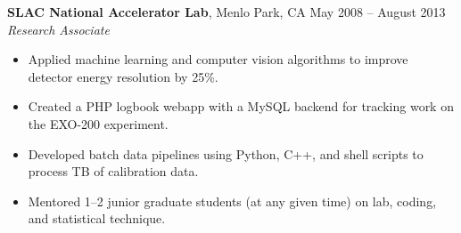 \documentclass[margin,line]{resume}
\begin{document}
\begin{resume}
    \textbf{SLAC National Accelerator Lab}, Menlo Park, CA \hfill May 2008 -- August 2013\vspace{1mm}\\\vspace{1mm}%
    \textsl{Research Associate}
    \begin{itemize}
    \item Applied machine learning and computer vision algorithms to improve detector energy resolution by 25\%.
    \item Created a PHP logbook webapp with a MySQL backend for tracking work on the EXO-200 experiment.
    \item Developed batch data pipelines using Python, C++, and shell scripts to process TB of calibration data.
    \item Mentored 1--2 junior graduate students (at any given time) on lab, coding, and statistical technique.
    \end{itemize}
    
    

\end{resume}
\end{document}

